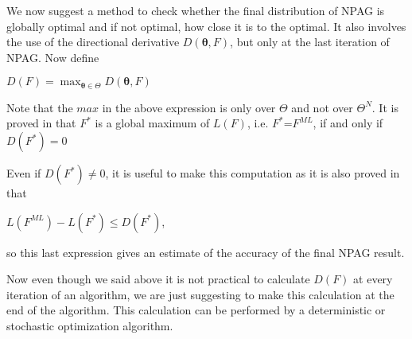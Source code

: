 
We now suggest a method to check whether the final distribution of NPAG is globally optimal and if not optimal, how close it is to the optimal.
It also involves the use of  the directional derivative $D(\bm{\theta},F)$, but only at the last iteration of NPAG.
Now define

$D(F)=\max_{\bm{\theta} \in \Theta}  D(\bm{\theta},F)$

\noindent Note that the $max$ in the above expression is only over
$\Theta$ and not over $\Theta^N$. 
It is proved in \citet{Lindsay1983} that $F^{*}$ is a global maximum of $L(F)$,
i.e. $F^{*}$=$F^{ML}$,  
if and only if  
$D(F^{*})= 0$

Even if  $D(F^{*}) \neq 0$, it is useful to make this computation as it is also proved in \citet{Lindsay1983} that

$L(F^{ML})-L(F^{*}) \le  D(F^{*})$, 

\noindent so this last expression gives an estimate of the accuracy of the final NPAG result.

Now even though we said above it is not practical to calculate 
$D(F)$ at every iteration of an algorithm, 
we are just suggesting to make this calculation at the end of the algorithm.  
This calculation can be performed by a deterministic or stochastic optimization algorithm.




